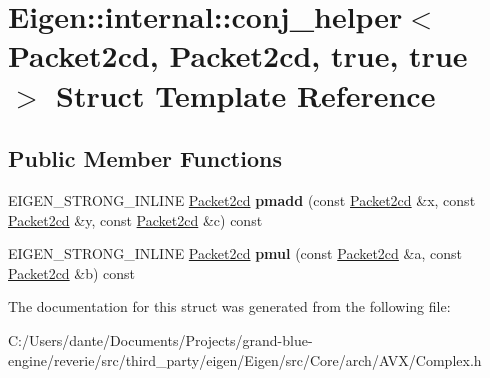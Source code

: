 \hypertarget{struct_eigen_1_1internal_1_1conj__helper_3_01_packet2cd_00_01_packet2cd_00_01true_00_01true_01_4}{}\section{Eigen\+::internal\+::conj\+\_\+helper$<$ Packet2cd, Packet2cd, true, true $>$ Struct Template Reference}
\label{struct_eigen_1_1internal_1_1conj__helper_3_01_packet2cd_00_01_packet2cd_00_01true_00_01true_01_4}
\subsection*{Public Member Functions}
\begin{DoxyCompactItemize}
\item 
\mbox{\label{struct_eigen_1_1internal_1_1conj__helper_3_01_packet2cd_00_01_packet2cd_00_01true_00_01true_01_4_a35755e54de7413497048b98f2ea64fea}} 
E\+I\+G\+E\+N\+\_\+\+S\+T\+R\+O\+N\+G\+\_\+\+I\+N\+L\+I\+NE \mbox{\hyperlink{struct_eigen_1_1internal_1_1_packet2cd}{Packet2cd}} {\bfseries pmadd} (const \mbox{\hyperlink{struct_eigen_1_1internal_1_1_packet2cd}{Packet2cd}} \&x, const \mbox{\hyperlink{struct_eigen_1_1internal_1_1_packet2cd}{Packet2cd}} \&y, const \mbox{\hyperlink{struct_eigen_1_1internal_1_1_packet2cd}{Packet2cd}} \&c) const
\item 
\mbox{\label{struct_eigen_1_1internal_1_1conj__helper_3_01_packet2cd_00_01_packet2cd_00_01true_00_01true_01_4_a9fff571edb209bb981023c4a117baf00}} 
E\+I\+G\+E\+N\+\_\+\+S\+T\+R\+O\+N\+G\+\_\+\+I\+N\+L\+I\+NE \mbox{\hyperlink{struct_eigen_1_1internal_1_1_packet2cd}{Packet2cd}} {\bfseries pmul} (const \mbox{\hyperlink{struct_eigen_1_1internal_1_1_packet2cd}{Packet2cd}} \&a, const \mbox{\hyperlink{struct_eigen_1_1internal_1_1_packet2cd}{Packet2cd}} \&b) const
\end{DoxyCompactItemize}


The documentation for this struct was generated from the following file\+:\begin{DoxyCompactItemize}
\item 
C\+:/\+Users/dante/\+Documents/\+Projects/grand-\/blue-\/engine/reverie/src/third\+\_\+party/eigen/\+Eigen/src/\+Core/arch/\+A\+V\+X/Complex.\+h\end{DoxyCompactItemize}
